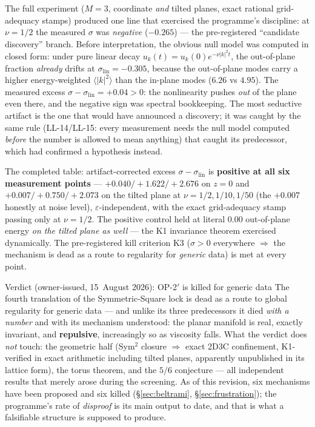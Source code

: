 \documentclass[11pt,a4paper]{article}
\theoremstyle{definition}
\theoremstyle{plain}
\begin{document}
The full experiment ($M=3$, coordinate \emph{and} tilted planes, exact rational grid-adequacy
stamps) produced one line that exercised the programme's discipline: at $\nu=1/2$ the measured
$\sigma$ was \emph{negative} ($-0.265$) --- the pre-registered ``candidate discovery'' branch.
Before interpretation, the obvious null model was computed in closed form: under pure linear
decay $u_k(t)=u_k(0)e^{-\nu|k|^2t}$, the out-of-plane fraction \emph{already} drifts at
$\sigma_{\mathrm{lin}}=-0.305$, because the out-of-plane modes carry a higher energy-weighted
$\langle|k|^2\rangle$ than the in-plane modes ($6.26$ vs $4.95$). The measured excess
$\sigma-\sigma_{\mathrm{lin}}=+0.04>0$: the nonlinearity pushes \emph{out} of the plane even
there, and the negative sign was spectral bookkeeping. The most seductive artifact is the one
that would have announced a discovery; it was caught by the same rule (LL-14/LL-15: every
measurement needs the null model computed \emph{before} the number is allowed to mean
anything) that caught its predecessor, which had confirmed a hypothesis instead.

The completed table: artifact-corrected excess $\sigma-\sigma_{\mathrm{lin}}$ is
\textbf{positive at all six measurement points} --- $+0.040/+1.622/+2.676$ on $z=0$ and
$+0.007/+0.750/+2.073$ on the tilted plane at $\nu=1/2,1/10,1/50$ (the $+0.007$ honestly at
noise level), $\varepsilon$-independent, with the exact grid-adequacy stamp passing only at
$\nu=1/2$. The positive control held at literal $0.00$ out-of-plane energy \emph{on the
tilted plane as well} --- the K1 invariance theorem exercised dynamically. The pre-registered
kill criterion K3 ($\sigma>0$ everywhere $\Rightarrow$ the mechanism is dead as a route to
regularity for \emph{generic} data) is met at every point.

\begin{keybox}{Verdict (owner-issued, 15~August 2026): OP-2$'$ is killed for generic data}
The fourth translation of the Symmetric-Square lock is dead as a route to global regularity
for generic data --- and unlike its three predecessors it died \emph{with a number} and with
its mechanism understood: the planar manifold is real, exactly invariant, and \textbf{repulsive},
increasingly so as viscosity falls. What the verdict does \emph{not} touch: the geometric half
(Sym$^2$ closure $\Rightarrow$ exact 2D3C confinement, K1-verified in exact arithmetic
including tilted planes, apparently unpublished in its lattice form), the torus theorem, and
the $5/6$ conjecture --- all independent results that merely arose during the screening. As of
this revision, six mechanisms have been proposed and six killed (\S\ref{sec:beltrami},
\S\ref{sec:frustration}); the programme's rate of \emph{disproof} is
its main output to date, and that is what a falsifiable structure is supposed to produce.
\end{keybox}
\end{document}
